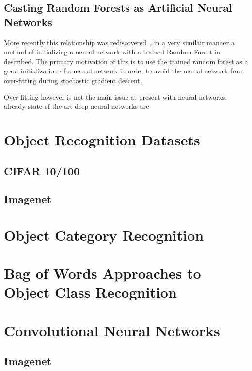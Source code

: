 \documentclass[thesis]{subfiles}
\begin{document}
\subsection{Casting Random Forests as Artificial Neural Networks}
More recently this relationship was rediscovered~\cite{Welbl2014casting}, in a very similair manner a method of initializing a neural network with a trained Random Forest in described. The primary motivation of this is to use the trained random forest as a good initialization of a neural network in order to avoid the neural network from over-fitting during stochastic gradient descent.


Over-fitting however is not the main issue at present with neural networks, already state of the art deep neural networks are


\section{Object Recognition Datasets}
\subsection{CIFAR 10/100}
\subsection{Imagenet}

\section{Object Category Recognition}
\section[Bag of Words]{Bag of Words Approaches to Object Class Recognition}

\section{Convolutional Neural Networks}
\subsection{Imagenet}
\end{document}
